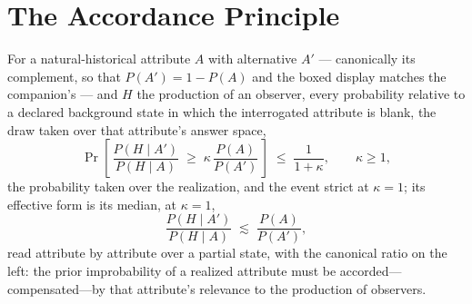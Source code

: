 \section{The Accordance Principle}
\label{sec:principle}

\begin{principle}\footnotemark
\label{prin:accordance}
For a natural-historical attribute $A$ with alternative $A'$ --- canonically its complement, so that $P(A') = 1 - P(A)$ and the boxed display matches the companion's \cite{Nexus} --- and $H$ the production of an observer, every probability relative to a declared background state in which the interrogated attribute is blank, the draw taken over that attribute's answer space,
\begin{equation}
\label{eq:exceedance}
\boxed{\;\Pr\!\left[\, \frac{P(H \mid A')}{P(H \mid A)} \;\ge\; \kappa\, \frac{P(A)}{P(A')} \,\right] \;\le\; \frac{1}{1+\kappa}, \qquad \kappa \ge 1,\;}
\end{equation}
the probability taken over the realization, and the event strict at $\kappa = 1$; its effective form is its median, at $\kappa = 1$,
\begin{equation}
\label{eq:accordance}
\frac{P(H \mid A')}{P(H \mid A)} \;\lesssim\; \frac{P(A)}{P(A')},
\end{equation}
read attribute by attribute over a partial state, with the canonical ratio on the left: the prior improbability of a realized attribute must be accorded---compensated---by that attribute's relevance to the production of observers.
\end{principle}
